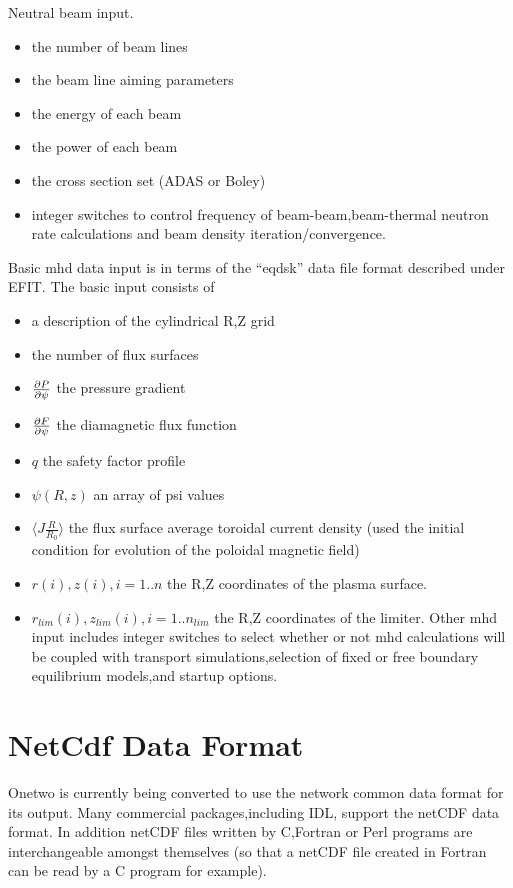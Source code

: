 \documentclass[12pt]{article}
\begin{document}
 Neutral beam  input.
 \begin{itemize}
  \item the number of beam lines
  \item the beam line aiming parameters
  \item the energy of each beam
  \item the power of each beam
  \item the cross section set (ADAS or Boley)
  \item integer switches to control frequency of beam-beam,beam-thermal
	neutron rate calculations and beam density iteration/convergence.
 \end{itemize}
 

 Basic mhd data input is in terms of the ``eqdsk'' data file format
 described under EFIT.
 The basic input consists of
 \begin{itemize}
  \item a description of the cylindrical R,Z grid
  \item the number of flux surfaces
  \item $ \frac{\partial{ P}}{\partial{ \psi}} $ the pressure gradient
  \item $ \frac{\partial{ F}}{\partial{ \psi}} $ the diamagnetic flux function
  \item $ q $ the safety factor profile
  \item $ \psi(R,z) $ an array of psi values 
  \item $\langle J \frac{R}{R_0} \rangle$ the flux surface average
	toroidal current density (used the  initial condition for
        evolution of the poloidal magnetic field)
  \item $r(i),z(i),i=1..n$ the R,Z coordinates of the plasma surface.
  \item $r_{lim}(i),z_{lim}(i),i=1..n_{lim}$ the R,Z coordinates of the limiter.
  Other mhd input includes integer switches to select whether or not
  mhd calculations will be coupled with transport simulations,selection
 of fixed or free boundary equilibrium models,and startup options.
 \end{itemize}

\section{NetCdf Data Format}
 Onetwo is currently being converted to use the network common data format
 for its output. Many commercial packages,including IDL, support the netCDF
 data format. In addition netCDF files written by C,Fortran or Perl programs
 are interchangeable amongst themselves (so that a netCDF file created
 in Fortran can be read by a C program for example).
 \nocite{*}


       
\end{document}
